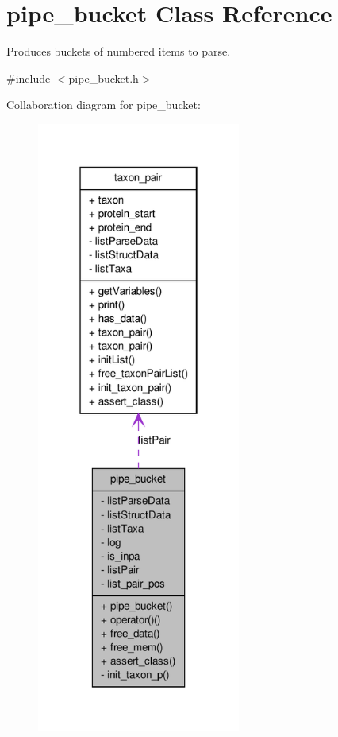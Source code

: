 \hypertarget{classpipe__bucket}{
\section{pipe\_\-bucket Class Reference}
\label{classpipe__bucket}
}


Produces buckets of numbered items to parse.  




{\ttfamily \#include $<$pipe\_\-bucket.h$>$}



Collaboration diagram for pipe\_\-bucket:
\nopagebreak
\begin{figure}[H]
\begin{center}
\leavevmode
\includegraphics[width=190pt]{classpipe__bucket__coll__graph}
\end{center}
\end{figure}
